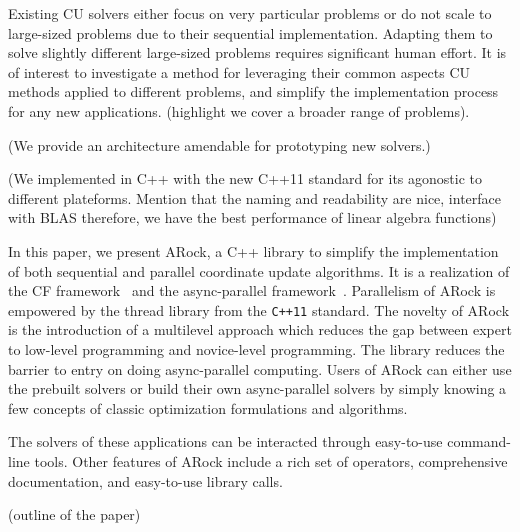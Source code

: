 Existing CU solvers \citep{hsieh2015passcode,jaggi2014communication,recht2011hogwild} either focus on very particular problems or do not scale to large-sized problems due to their sequential implementation. 
Adapting them to solve slightly different large-sized problems requires significant human effort. 
It is of interest to investigate a method for leveraging their common aspects CU methods applied to different problems, and simplify the implementation process for any new applications. (highlight we cover a broader range of problems).

(We provide an architecture amendable for prototyping new solvers.)

(We implemented in C++ with the new C++11 standard for its agonostic to different plateforms. Mention that the naming and readability are nice, interface with BLAS therefore, we have the best performance of linear algebra functions) 

In this paper, we present ARock, a C++ library to simplify the implementation of both sequential and parallel coordinate update algorithms. It is a realization of the CF framework~\citep{peng2016coordinate} and the async-parallel framework~\citep{peng2015arock}. Parallelism of ARock is empowered by the thread library from the \texttt{C++11} standard. The novelty of ARock is the introduction of a multilevel approach which reduces the gap between expert to low-level programming and novice-level programming.
The library reduces the barrier to entry on doing async-parallel computing. 
Users of ARock can either use the prebuilt solvers or build their own async-parallel solvers by simply knowing a few concepts of classic optimization formulations and algorithms.

 
The solvers of these applications can be interacted through easy-to-use command-line tools. 
Other features of ARock include a rich set of operators, comprehensive documentation, and easy-to-use library calls.



(outline of the paper)
